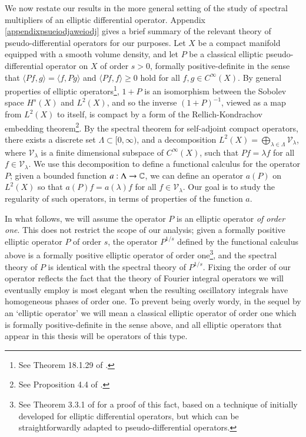 We now restate our results in the more general setting of the study of spectral multipliers of an elliptic differential operator. Appendix \ref{appendixpsueiodjaweiodj} gives a brief summary of the relevant theory of pseudo-differential operators for our purposes. Let $X$ be a compact manifold equipped with a smooth volume density, and let $P$ be a classical elliptic pseudo-differential operator on $X$ of order $s > 0$, formally positive-definite in the sense that $\langle Pf, g \rangle = \langle f, Pg \rangle$ and $\langle Pf, f \rangle \geq 0$ hold for all $f,g \in C^\infty(X)$. By general properties of elliptic operators\footnote{See Theorem 18.1.29 of \cite{Hormander3}.}, $1 + P$ is an isomorphism between the Sobolev space $H^s(X)$ and $L^2(X)$,
%
%
and so the inverse $(1 + P)^{-1}$, viewed as a map from $L^2(X)$ to itself, is compact by a form of the Rellich-Kondrachov embedding theorem\footnote{See Proposition 4.4 of \cite{Taylor}.}. By the spectral theorem for self-adjoint compact operators, there exists a discrete set $\Lambda \subset [0,\infty)$, and a decomposition $L^2(X) = \bigoplus\nolimits_{\lambda \in \Lambda} \mathcal{V}_\lambda$, where $\mathcal{V}_\lambda$ is a finite dimensional subspace of $C^\infty(X)$, such that $Pf = \lambda f$ for all $f \in \mathcal{V}_\lambda$. We use this decomposition to define a functional calculus for the operator $P$; given a bounded function $a: \Lambda \to \operatorname{\mathbb{C}}$, we can define an operator $a(P)$ on $L^2(X)$ so that $a(P) f = a(\lambda) f$ for all $f \in \mathcal{V}_\lambda$. Our goal is to study the regularity of such operators, in terms of properties of the function $a$.

In what follows, we will assume the operator $P$ is an elliptic operator \emph{of order one}. This does not restrict the scope of our analysis; given a formally positive elliptic operator $P$ of order $s$, the operator $P^{1/s}$ defined by the functional calculus above is a formally positive elliptic operator of order one\footnote{See Theorem 3.3.1 of \cite{Sogge} for a proof of this fact, based on a technique of \cite{Seeley} initially developed for elliptic differential operators, but which can be straightforwardly adapted to pseudo-differential operators.}, and the spectral theory of $P$ is identical with the spectral theory of $P^{1/s}$. Fixing the order of our operator reflects the fact that the theory of Fourier integral operators we will eventually employ is most elegant when the resulting oscillatory integrals have homogeneous phases of order one. To prevent being overly wordy, in the sequel by an `elliptic operator' we will mean a classical elliptic operator of order one which is formally positive-definite in the sense above, and all elliptic operators that appear in this thesis will be operators of this type.

